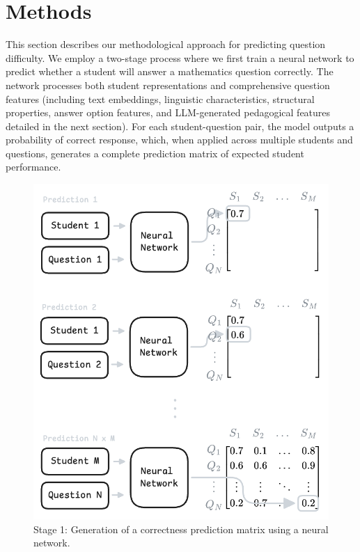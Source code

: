 \documentclass[
    a4paper, %
    10pt, %
    twoside, %
]{LTJournalArticle}
\begin{document}




\section{Methods}

This section describes our methodological approach for predicting question difficulty. We employ a two-stage process where we first train a neural network to predict whether a student will answer a mathematics question correctly. The network processes both student representations and comprehensive question features (including text embeddings, linguistic characteristics, structural properties, answer option features, and LLM-generated pedagogical features detailed in the next section). For each student-question pair, the model outputs a probability of correct response, which, when applied across multiple students and questions, generates a complete prediction matrix of expected student performance.

\begin{figure}[H]
    \centering
    \includegraphics[width=0.8\columnwidth]{figures/stage1.png}
    \caption{Stage 1: Generation of a correctness prediction matrix using a neural network.}
    \label{fig:stage1}
\end{figure}
\end{document}
